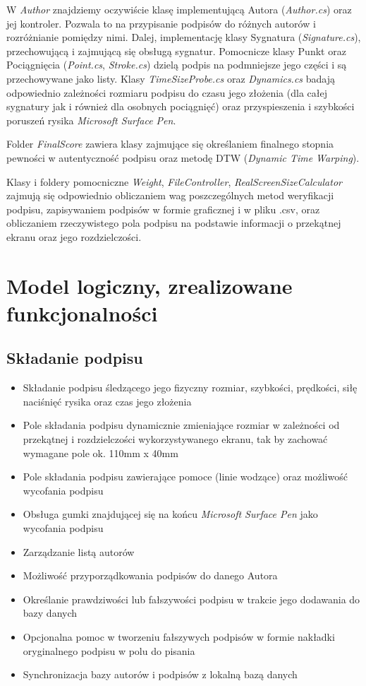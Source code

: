\documentclass[notitlepage, oneside]{report}
\begin{document}
 W  \textit{Author} znajdziemy oczywiście klasę implementującą Autora (\textit{Author.cs}) oraz jej kontroler. Pozwala to na przypisanie podpisów do różnych autorów i rozróżnianie pomiędzy nimi. Dalej, implementację klasy Sygnatura (\textit{Signature.cs}), przechowującą i zajmującą się obsługą sygnatur. Pomocnicze klasy Punkt oraz Pociągnięcia (\textit{Point.cs}, \textit{Stroke.cs}) dzielą podpis na podmniejsze jego części i są przechowywane jako listy. Klasy \textit{TimeSizeProbe.cs} oraz \textit{Dynamics.cs} badają odpowiednio zależności rozmiaru podpisu do czasu jego złożenia (dla całej sygnatury jak i również dla osobnych pociągnięć) oraz przyspieszenia i szybkości poruszeń rysika \textit{Microsoft Surface Pen}.
 
   Folder \textit{FinalScore} zawiera klasy zajmujące się określaniem finalnego stopnia pewności w autentyczność podpisu oraz metodę DTW (\textit{Dynamic Time Warping}).
   
    Klasy i foldery pomocniczne \textit{Weight}, \textit{FileController}, \textit{RealScreenSizeCalculator} zajmują się odpowiednio obliczaniem wag poszczególnych metod weryfikacji podpisu, zapisywaniem podpisów w formie graficznej i w pliku .csv, oraz obliczaniem rzeczywistego pola podpisu na podstawie informacji o przekątnej ekranu oraz jego rozdzielczości.
    



\chapter*{Model logiczny, zrealizowane funkcjonalności}
\section*{Składanie podpisu}
\begin{itemize}
  \item Składanie podpisu śledzącego jego fizyczny rozmiar, szybkości, prędkości, siłę naciśnięć rysika oraz czas jego złożenia
  \item Pole składania podpisu dynamicznie zmieniające rozmiar w zależności od przekątnej i rozdzielczości wykorzystywanego ekranu, tak by zachować wymagane pole ok. 110mm x 40mm
  \item Pole składania podpisu zawierające pomoce (linie wodzące) oraz możliwość wycofania podpisu
  \item Obsługa gumki znajdującej się na końcu \textit{Microsoft Surface Pen} jako wycofania podpisu
  \item Zarządzanie listą autorów
  \item Możliwość przyporządkowania podpisów do danego Autora
  \item Określanie prawdziwości lub fałszywości podpisu w trakcie jego dodawania do bazy danych
  \item Opcjonalna pomoc w tworzeniu fałszywych podpisów w formie nakładki oryginalnego podpisu w polu do pisania
  \item Synchronizacja bazy autorów i podpisów z lokalną bazą danych
 \end{itemize}
\end{document}
